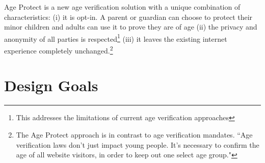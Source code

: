 \documentclass[11pt, oneside]{article}   	%
\begin{document}
Age Protect is a new age verification solution with a unique combination of characteristics: (i) it is opt-in. A parent or guardian can choose to protect their minor children and adults can use it to prove they are of age (ii) the privacy and anonymity of all parties is respected\footnote{This addresses the limitations of current age verification approaches\cite{Roth2023}} (iii) it leaves the existing internet experience completely unchanged.\footnote{The Age Protect approach is in contrast to age verification mandates. ``Age verification laws don’t just impact young people. It’s necessary to confirm the age of all website visitors, in order to keep out one select age group."\cite{Kelley2023}}

\section{Design Goals}
\end{document}

